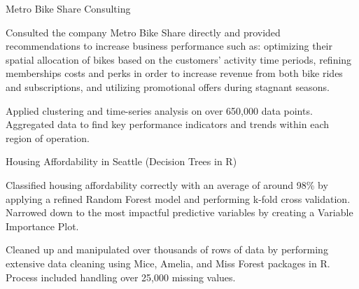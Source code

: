

\begin{cvsubentries}

  \cvsubentry
    {Metro Bike Share Consulting} %
    {
      \begin{cvitems} %
        \item {Consulted the company Metro Bike Share directly and provided recommendations to increase business performance such as: optimizing their spatial allocation of bikes based on the customers’ activity time periods, refining memberships costs and perks in order to increase revenue from both bike rides and subscriptions, and utilizing promotional offers during stagnant seasons.}
        \item {Applied clustering and time-series analysis on over 650,000 data points. Aggregated data to find key performance indicators and trends within each region of operation.}
      \end{cvitems}
  	}

  \cvsubentry
    {Housing Affordability in Seattle (Decision Trees in R)} %
    {
      \begin{cvitems} %
        \item {Classified housing affordability correctly with an average of around 98\% by applying a refined Random Forest model and performing k-fold cross validation. Narrowed down to the most impactful predictive variables by creating a Variable Importance Plot.}
        \item {Cleaned up and manipulated over thousands of rows of data by performing extensive data cleaning using Mice, Amelia, and Miss Forest packages in R. Process included handling over 25,000 missing values.}
      \end{cvitems}
  	}

\end{cvsubentries}
